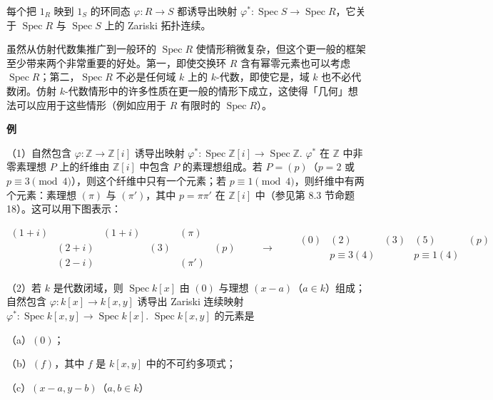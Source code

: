 \begin{proposition}\label{pro:15.55}
每个把 \(1_R\) 映到 \(1_S\) 的环同态 \(\varphi : R \to S\) 都诱导出映射 \(\varphi^* : \operatorname{Spec}S \to \operatorname{Spec}R\)，它关于 \(\operatorname{Spec}R\) 与 \(\operatorname{Spec}S\) 上的 Zariski 拓扑连续。
\end{proposition}

虽然从仿射代数集推广到一般环的 \(\operatorname{Spec}R\) 使情形稍微复杂，但这个更一般的框架至少带来两个非常重要的好处。第一，即使交换环 \(R\) 含有幂零元素也可以考虑 \(\operatorname{Spec}R\)；第二，\(\operatorname{Spec}R\) 不必是任何域 \(k\) 上的 \(k\)-代数，即使它是，域 \(k\) 也不必代数闭。仿射 \(k\)-代数情形中的许多性质在更一般的情形下成立，这使得「几何」想法可以应用于这些情形（例如应用于 \(R\) 有限时的 \(\operatorname{Spec}R\)）。

\noindent\textbf{例}

（1）自然包含 \(\varphi : \mathbb{Z} \to \mathbb{Z}[i]\) 诱导出映射 \(\varphi^* : \operatorname{Spec}\mathbb{Z}[i] \to \operatorname{Spec}\mathbb{Z}\). \(\varphi^*\) 在 \(\mathbb{Z}\) 中非零素理想 \(P\) 上的纤维由 \(\mathbb{Z}[i]\) 中包含 \(P\) 的素理想组成。若 \(P = (p)\)（\(p = 2\) 或 \(p \equiv 3 \pmod 4\)），则这个纤维中只有一个元素；若 \(p \equiv 1 \pmod 4\)，则纤维中有两个元素：素理想 \((\pi)\) 与 \((\pi')\)，其中 \(p = \pi\pi'\) 在 \(\mathbb{Z}[i]\) 中（参见第 8.3 节命题 18）。这可以用下图表示：

\[
\begin{array}{cccccc}
(1+i) & & (1+i) & & (\pi) & \\
& (2+i) & & (3) & & (p)\\
& (2-i) & & & (\pi') &
\end{array}
\qquad\longrightarrow\qquad
\begin{array}{ccccc}
(0) & (2) & (3) & (5) & (p)\\
& p\equiv3 (4) & & p\equiv1 (4) &
\end{array}
\]

（2）若 \(k\) 是代数闭域，则 \(\operatorname{Spec}k[x]\) 由 \((0)\) 与理想 \((x-a)\)（\(a \in k\)）组成；自然包含 \(\varphi : k[x] \to k[x,y]\) 诱导出 Zariski 连续映射 \(\varphi^* : \operatorname{Spec}k[x,y] \to \operatorname{Spec}k[x]\). \(\operatorname{Spec}k[x,y]\) 的元素是

（a）\((0)\)；

（b）\((f)\)，其中 \(f\) 是 \(k[x,y]\) 中的不可约多项式；

（c）\((x-a, y-b)\)（\(a, b \in k\)）

